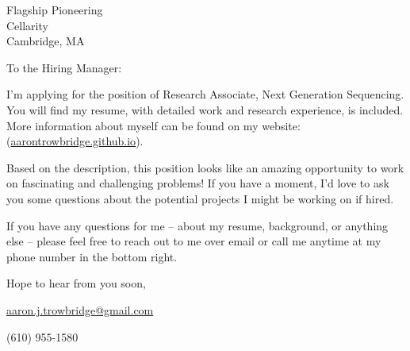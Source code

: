 \documentclass{letter}
\newcommand{\position}   {Research Associate, Next Generation Sequencing}
\newcommand{\company}    {Flagship Pioneering}
\newcommand{\department} {Cellarity}
\newcommand{\city}       {Cambridge, MA}
\begin{document}
\begin{letter}{\company \\ \department \\ \city}

\opening{To the Hiring Manager:}

I'm applying for the position of \position. You will find my resume, with detailed work and research experience, is included.  More information about myself can be found on my website: \\ (\href{https://aarontrowbridge.github.io/}{aarontrowbridge.github.io}).

Based on the description, this position looks like an amazing opportunity to work on fascinating and challenging problems! If you have a moment, I'd love to ask you some questions about the potential projects I might be working on if hired.

If you have any questions for me -- about my resume, background, or anything else -- please feel free to reach out to me over email or call me anytime at my phone number in the bottom right.  

\closing{Hope to hear from you soon,}

\vfill 

\hfill \href{mailto:aaron.j.trowbridge@gmail.com}{aaron.j.trowbridge@gmail.com} 

\hfill (610) 955-1580

\end{letter}
\end{document}
